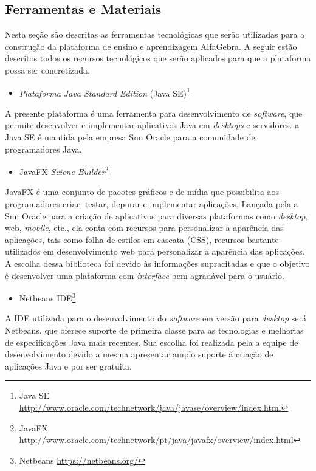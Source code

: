\subsection{Ferramentas e Materiais}
\noindent Nesta seção são descritas as ferramentas tecnológicas que serão utilizadas para a construção da plataforma de ensino e aprendizagem AlfaGebra. A seguir estão descritos todos os recursos tecnológicos que serão aplicados para que a plataforma possa ser concretizada.

\begin{itemize}
    \item \textit{Plataforma Java Standard Edition} (Java SE)\footnote[12]{Java SE \url{http://www.oracle.com/technetwork/java/javase/overview/index.html}}
\end{itemize}
\noindent A presente plataforma é uma ferramenta para desenvolvimento de \textit{software}, que permite desenvolver e implementar aplicativos Java em \textit{desktops} e servidores. a Java SE é mantida pela empresa Sun Oracle para a comunidade de programadores Java.

\begin{itemize}
    \item JavaFX \textit{Sciene Builder}\footnote[13]{JavaFX \url{http://www.oracle.com/technetwork/pt/java/javafx/overview/index.html}}
\end{itemize}
\noindent JavaFX é uma conjunto de pacotes gráficos e de mídia que possibilita aos programadores criar, testar, depurar e implementar aplicações. Lançada pela a Sun Oracle para a criação de aplicativos para diversas plataformas como \textit{desktop}, web, \textit{mobile}, etc., ela conta com recursos para personalizar a aparência das aplicações, tais como folha de estilos em cascata (CSS), recursos bastante utilizados em desenvolvimento web para personalizar a aparência das aplicações. A escolha dessa biblioteca foi devido às informações supracitadas e que o objetivo é desenvolver uma plataforma com \textit{interface} bem agradável para o usuário.

\begin{itemize}
    \item Netbeans IDE\footnote[14]{Netbeans \url{https://netbeans.org/}}
\end{itemize}
A IDE utilizada para o desenvolvimento do \textit{software} em versão para \textit{desktop} será Netbeans, que oferece suporte de primeira classe para as tecnologias e melhorias de especificações Java mais recentes. Sua escolha foi realizada pela a equipe de desenvolvimento devido a mesma apresentar amplo suporte à criação de aplicações Java e por ser gratuita.

